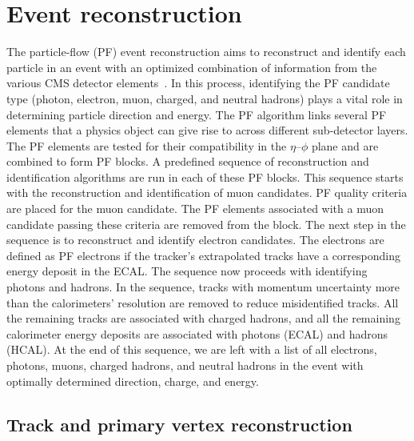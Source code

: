 %
%

\chapter{Event reconstruction}
\label{event_reco}

The particle-flow (PF) event reconstruction aims to reconstruct and identify each particle in an event with an optimized combination of information from the various CMS detector elements~\cite{Sirunyan:2017ulk}. In this process, identifying the PF candidate type (photon, electron, muon, charged, and neutral hadrons) plays a vital role in determining particle direction and energy. The PF algorithm links several PF elements that a physics object can give rise to across different sub-detector layers. The PF elements are tested for their compatibility in the $\eta$--$\phi$ plane and are combined to form PF blocks. A predefined sequence of reconstruction and identification algorithms are run in each of these PF blocks. This sequence starts with the reconstruction and identification of muon candidates. PF quality criteria are placed for the muon candidate. The PF elements associated with a muon candidate passing these criteria are removed from the block. The next step in the sequence is to reconstruct and identify electron candidates. The electrons are defined as PF electrons if the tracker's extrapolated tracks have a corresponding energy deposit in the ECAL. The sequence now proceeds with identifying photons and hadrons. In the sequence, tracks with momentum uncertainty more than the calorimeters' resolution are removed to reduce misidentified tracks. All the remaining tracks are associated with charged hadrons, and all the remaining calorimeter energy deposits are associated with photons (ECAL) and hadrons (HCAL). At the end of this sequence, we are left with a list of all electrons, photons, muons, charged hadrons, and neutral hadrons in the event with optimally determined direction, charge, and energy.


\section{Track and primary vertex reconstruction}

